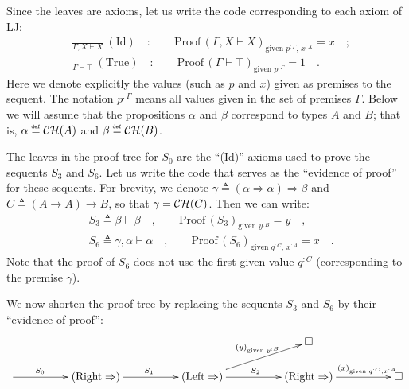 Since the leaves are axioms, let us write the code corresponding to
each axiom of LJ:
\begin{align*}
 & \frac{}{\Gamma,X\vdash X}~(\text{Id})\quad:\quad\quad\text{Proof}\,(\Gamma,X\vdash X)_{\text{given }p^{:\Gamma},\,x^{:X}}=x\quad;\\
 & \frac{}{\Gamma\vdash\top}~(\text{True})\quad:\quad\quad\text{Proof}\,(\Gamma\vdash\top)_{\text{given }p^{:\Gamma}}=1\quad.
\end{align*}
Here we denote explicitly the values (such as $p$ and $x$) given
as premises to the sequent. The notation $p^{:\Gamma}$ means all
values given in the set of premises $\Gamma$. Below we will assume
that the propositions $\alpha$ and $\beta$ correspond to types $A$
and $B$; that is, $\alpha\triangleq{\cal CH}(A)$ and $\beta\triangleq{\cal CH}(B)$.

The leaves in the proof tree for $S_{0}$ are the \textsf{``}($\text{Id}$)\textsf{''}
axioms used to prove the sequents $S_{3}$ and $S_{6}$. Let us write
the code that serves as the \textsf{``}evidence of proof\textsf{''} for these sequents.
For brevity, we denote $\gamma\triangleq\left(\alpha\Rightarrow\alpha\right)\Rightarrow\beta$
and $C\triangleq\left(A\rightarrow A\right)\rightarrow B$, so that
$\gamma={\cal CH}(C)$. Then we can write:
\begin{align*}
 & S_{3}\triangleq\beta\vdash\beta\quad,\quad\quad\text{Proof}\,(S_{3})_{\text{given }y^{:B}}=y\quad,\\
 & S_{6}\triangleq\gamma,\alpha\vdash\alpha\quad,\quad\quad\text{Proof}\,(S_{6})_{\text{given }q^{:C},\,x^{:A}}=x\quad.
\end{align*}
Note that the proof of $S_{6}$ does not use the first given value
$q^{:C}$ (corresponding to the premise $\gamma$).

We now shorten the proof tree by replacing the sequents $S_{3}$ and
$S_{6}$ by their \textsf{``}evidence of proof\textsf{''}:
\[
\xymatrix{\xyScaleY{1.5pc}\xyScaleX{4.2pc} &  &  & \square\\
\ar[r]\sp(0.35){S_{0}} & (\text{Right}\Rightarrow)\ar[r]\sp(0.5){S_{1}} & (\text{Left}\Rightarrow)\ar[r]\sp(0.5){S_{2}}\ar[ru]\sp(0.6){(y)_{\text{given }y^{:B}}} & (\text{Right}\Rightarrow)\ar[r]\sp(0.65){(x)_{\text{given }q^{:C},x^{:A}}} & \square
}
\]

